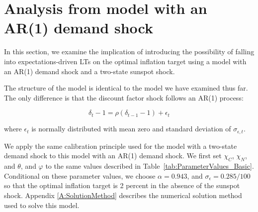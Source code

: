 \documentclass[11pt]{article}
\begin{document}
	\section{Analysis from model with an AR(1) demand shock}
	\label{S:AR1Model}

    In this section, we examine the implication of introducing the possibility of falling into expectations-driven LTs on the optimal inflation target using a model with an AR(1) demand shock and a two-state sunspot shock. 
    
    The structure of the model is identical to the model we have examined thus far. The only difference is that the discount factor shock follows an AR(1) process:
    
    \begin{equation}
	\delta_{t}-1 = \rho (\delta_{t-1}-1)+\epsilon_{t}
    \end{equation}

    \noindent where $\epsilon_{t}$ is normally distributed with mean zero and standard deviation of $\sigma_{\epsilon,t}$. 

    We apply the same calibration principle used for the model with a two-state demand shock to this model with an AR(1) demand shock. We first set $\chi_{C}$, $\chi_{N}$, and $\theta$, and $\varphi$ to the same values described in Table~\ref{tab:ParameterValues_Basic}. Conditional on these parameter values, we choose $\alpha = 0.943$, and $\sigma_{\epsilon} = 0.285/100$ so that the optimal inflation target is 2 percent in the absence of the sunspot shock. Appendix \ref{A:SolutionMethod} describes the numerical solution method used to solve this model.
    
\end{document}
